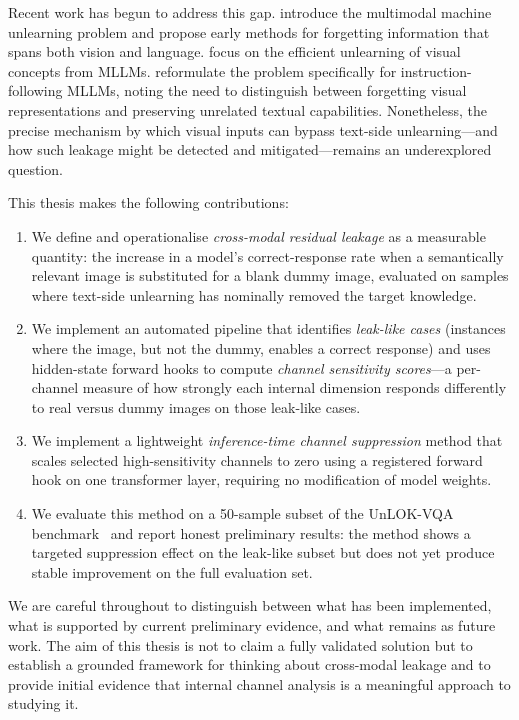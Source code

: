 \documentclass[12pt, a4paper]{article}
\begin{document}
Recent work has begun to address this gap.
\citet{multidelete2023} introduce the multimodal machine unlearning problem and propose
early methods for forgetting information that spans both vision and language.
\citet{singleimage2024} focus on the efficient unlearning of visual concepts from MLLMs.
\citet{mmunlearner2025} reformulate the problem specifically for instruction-following
MLLMs, noting the need to distinguish between forgetting visual representations and
preserving unrelated textual capabilities.
Nonetheless, the precise mechanism by which visual inputs can bypass text-side
unlearning---and how such leakage might be detected and mitigated---remains an
underexplored question.

This thesis makes the following contributions:

\begin{enumerate}[label=(\arabic*), leftmargin=*, itemsep=2pt]
  \item We define and operationalise \emph{cross-modal residual leakage} as a measurable
    quantity: the increase in a model's correct-response rate when a semantically
    relevant image is substituted for a blank dummy image, evaluated on samples where
    text-side unlearning has nominally removed the target knowledge.

  \item We implement an automated pipeline that identifies \emph{leak-like cases}
    (instances where the image, but not the dummy, enables a correct response) and uses
    hidden-state forward hooks to compute \emph{channel sensitivity scores}---a
    per-channel measure of how strongly each internal dimension responds differently to
    real versus dummy images on those leak-like cases.

  \item We implement a lightweight \emph{inference-time channel suppression} method that
    scales selected high-sensitivity channels to zero using a registered forward hook on
    one transformer layer, requiring no modification of model weights.

  \item We evaluate this method on a 50-sample subset of the UnLOK-VQA
    benchmark~\citep{unlok2025} and report honest preliminary results: the method shows
    a targeted suppression effect on the leak-like subset but does not yet produce
    stable improvement on the full evaluation set.
\end{enumerate}

We are careful throughout to distinguish between what has been implemented, what is
supported by current preliminary evidence, and what remains as future work.
The aim of this thesis is not to claim a fully validated solution but to establish a
grounded framework for thinking about cross-modal leakage and to provide initial evidence
that internal channel analysis is a meaningful approach to studying it.
\end{document}
